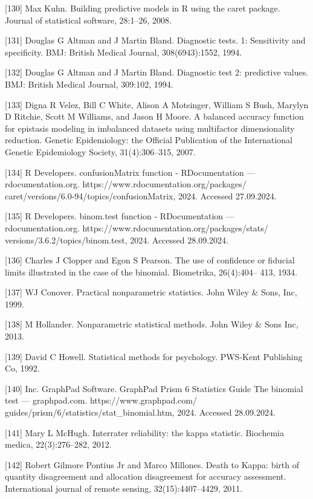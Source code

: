 \documentclass[preprint,12pt]{elsarticle}
\begin{document}
[130] Max Kuhn. Building predictive models in R using the caret package. Journal of statistical software, 28:1–26, 2008. 

[131] Douglas G Altman and J Martin Bland. Diagnostic tests. 1: Sensitivity and specificity. BMJ: British Medical Journal, 308(6943):1552, 1994. 

[132] Douglas G Altman and J Martin Bland. Diagnostic test 2: predictive values. BMJ: British Medical Journal, 309:102, 1994. 

[133] Digna R Velez, Bill C White, Alison A Motsinger, William S Bush, Marylyn D Ritchie, Scott M Williams, and Jason H Moore. A balanced accuracy function for epistasis modeling in imbalanced datasets using multifactor dimensionality reduction. Genetic Epidemiology: the Official Publication of the International Genetic Epidemiology Society, 31(4):306–315, 2007. 

[134] R Developers. confusionMatrix function - RDocumentation — rdocumentation.org. https://www.rdocumentation.org/packages/ caret/versions/6.0-94/topics/confusionMatrix, 2024. Accessed 27.09.2024. 

[135] R Developers. binom.test function - RDocumentation — rdocumentation.org. https://www.rdocumentation.org/packages/stats/ versions/3.6.2/topics/binom.test, 2024. Accessed 28.09.2024. 

[136] Charles J Clopper and Egon S Pearson. The use of confidence or fiducial limits illustrated in the case of the binomial. Biometrika, 26(4):404– 413, 1934. 

[137] WJ Conover. Practical nonparametric statistics. John Wiley & Sons, Inc, 1999. 

[138] M Hollander. Nonparametric statistical methods. John Wiley & Sons Inc, 2013. 

[139] David C Howell. Statistical methods for psychology. PWS-Kent Publishing Co, 1992. 

[140] Inc. GraphPad Software. GraphPad Prism 6 Statistics Guide The binomial test — graphpad.com. https://www.graphpad.com/ guides/prism/6/statistics/stat_binomial.htm, 2024. Accessed 28.09.2024. 

[141] Mary L McHugh. Interrater reliability: the kappa statistic. Biochemia medica, 22(3):276–282, 2012. 

[142] Robert Gilmore Pontius Jr and Marco Millones. Death to Kappa: birth of quantity disagreement and allocation disagreement for accuracy assessment. International journal of remote sensing, 32(15):4407–4429, 2011. 
\end{document}
